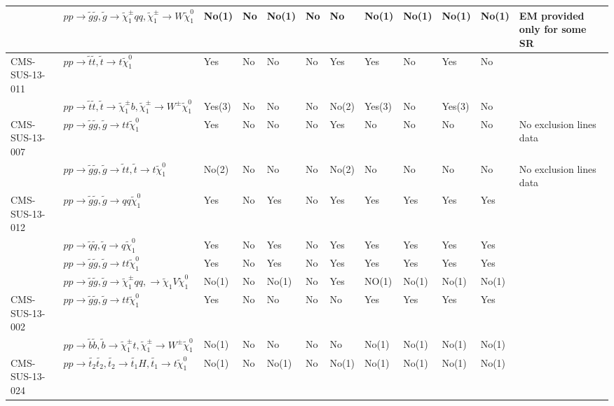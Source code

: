 \documentclass[11pt,A4paper]{article}
\begin{document}
\begin{landscape}
\begin{longtable} {|l|l|l|l|l|l|l|l|l|l|l|l|}
  & $pp \rightarrow \tilde{g} \tilde{g}, \tilde{g}\rightarrow \tilde{\chi}_1 ^{\pm} q q, \tilde{\chi}_1 ^{\pm} \rightarrow  W  \tilde{\chi}_1 ^0$ & No(1) & No & No(1) & No & No & No(1) & No(1) & No(1) & No(1) & EM provided only for some SR\\ \hline
CMS-SUS-13-011 & $pp \rightarrow \tilde{t} \tilde{t}, \tilde{t}\rightarrow t  \tilde{\chi}_1 ^0 $ & Yes & No & No & No & Yes & Yes & No & Yes & No & \\
  & $pp \rightarrow \tilde{t} \tilde{t}, \tilde{t}\rightarrow \tilde{\chi}_1 ^{\pm} b,\tilde{\chi}_1 ^{\pm} \rightarrow W^{\pm} \tilde{\chi}_1 ^0$ & Yes(3) & No & No & No & No(2) & Yes(3) & No & Yes(3) & No & \\ \hline
CMS-SUS-13-007 & $pp \rightarrow \tilde{g} \tilde{g}, \tilde{g}\rightarrow t  t  \tilde{\chi}_1 ^0 $ & Yes & No & No & No & Yes & No & No & No & No & No exclusion lines data\\
  & $pp \rightarrow \tilde{g} \tilde{g}, \tilde{g}\rightarrow \tilde{t} t,\tilde{t}\rightarrow t \tilde{\chi}_1 ^0$ & No(2) & No & No & No & No(2) & No & No & No & No & No exclusion lines data\\ \hline
CMS-SUS-13-012 & $pp \rightarrow \tilde{g} \tilde{g}, \tilde{g}\rightarrow q q  \tilde{\chi}_1 ^0 $ & Yes & No & Yes & No & Yes & Yes & Yes & Yes & Yes & \\
 & $pp \rightarrow \tilde{q} \tilde{q}, \tilde{q}\rightarrow q  \tilde{\chi}_1 ^0 $ & Yes & No & Yes & No & Yes & Yes & Yes & Yes & Yes & \\
 & $pp \rightarrow \tilde{g} \tilde{g}, \tilde{g}\rightarrow t  t  \tilde{\chi}_1 ^0 $ & Yes & No & Yes & No & Yes & Yes & Yes & Yes & Yes & \\
  & $pp \rightarrow \tilde{g} \tilde{g}, \tilde{g}\rightarrow \tilde{\chi}_1 ^{\pm} q q,  \rightarrow \tilde{\chi}_1 V  \tilde{\chi}_1 ^0$ & No(1) & No & No(1) & No & Yes & NO(1) & No(1) & No(1) & No(1) & \\ \hline
CMS-SUS-13-002 & $pp \rightarrow \tilde{g} \tilde{g}, \tilde{g}\rightarrow t  t  \tilde{\chi}_1 ^0 $ & Yes & No & No & No & No & Yes & Yes & Yes & Yes & \\
  & $pp \rightarrow \tilde{b} \tilde{b}, \tilde{b}\rightarrow \tilde{\chi}_1 ^{\pm} t,\tilde{\chi}_1 ^{\pm} \rightarrow W^{\pm} \tilde{\chi}_1 ^0$ & No(1) & No & No & No & No & No(1) & No(1) & No(1) & No(1) & \\ \hline
CMS-SUS-13-024 & $pp \rightarrow \tilde{t_2} \tilde{t_2}, \tilde{t_2}\rightarrow \tilde{t_1} H , \tilde{t_1} \rightarrow t \tilde{\chi}_1 ^0$ & No(1) & No & No(1) & No & No(1) & No(1) & No(1) & No(1) & No(1) & \\

\end{longtable}
\end{landscape}
\end{document}
